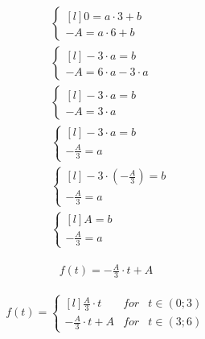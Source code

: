 \begin{task}
\begin{align*}
&\left\{\begin{matrix*}[l]
0 = a\cdot 3 +b\\ 
-A = a\cdot 6 +b
\end{matrix*}\right. \\
&\left\{\begin{matrix*}[l]
-3 \cdot a = b\\ 
-A = 6 \cdot a -3 \cdot a
\end{matrix*}\right. \\
&\left\{\begin{matrix*}[l]
-3 \cdot a = b\\ 
-A = 3 \cdot a
\end{matrix*}\right. \\
&\left\{\begin{matrix*}[l]
-3 \cdot a = b\\  
-\frac{A}{3} = a
\end{matrix*}\right. \\
&\left\{\begin{matrix*}[l]
-3 \cdot (-\frac{A}{3}) = b\\
-\frac{A}{3} = a
\end{matrix*}\right. \\
&\left\{\begin{matrix*}[l]
A = b\\
-\frac{A}{3} = a
\end{matrix*}\right.
\end{align*}


\begin{align*}
f(t) = -\frac{A}{3}\cdot t + A
\end{align*}


\begin{align*}
f(t) = \left\{\begin{matrix*}[l]
\frac{A}{3}\cdot t & for &t \in (0;3)\\ 
-\frac{A}{3}\cdot t + A & for & t \in (3; 6)
\end{matrix*}\right.
\end{align*}


\end{task}
